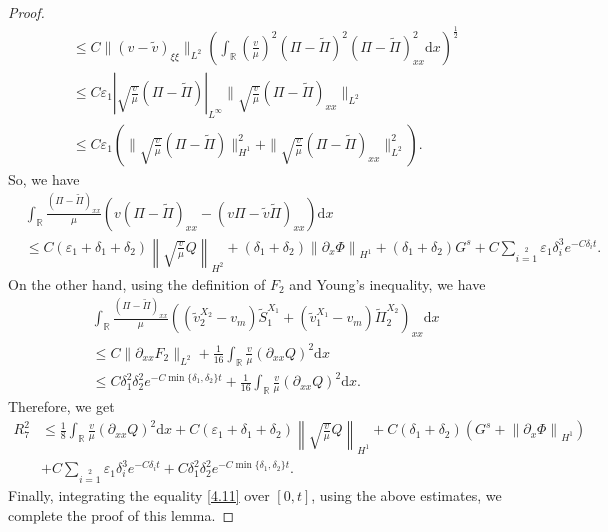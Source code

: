 \documentclass[10pt,a4paper]{amsart}
\newcommand{\dif}{\mathrm{d}}
\begin{document}
\begin{proof}
\begin{align*}
&\leq C
\|(v-\widetilde{v})_{\xi\xi}\|_{L^2}
\left(\int_\mathbb{R}\left(\frac{v}{\mu}\right)^2(\Pi-\widetilde{\Pi})^2(\Pi-\widetilde{\Pi})_{xx}^2\dif x\right)^{\frac{1}{2}}\\
&\leq C\varepsilon_1|\sqrt{\frac{v}{\mu}}(\Pi-\widetilde{\Pi})|_{L^{\infty}}
\|\sqrt{\frac{v}{\mu}}(\Pi-\widetilde{\Pi})_{xx}\|_{L^2}\\
&\leq C\varepsilon_1\left(\|\sqrt{\frac{v}{\mu}}(\Pi-\widetilde{\Pi})\|_{H^1}^2+
\|\sqrt{\frac{v}{\mu}}(\Pi-\widetilde{\Pi})_{xx}\|_{L^2}^2\right).
\end{align*}
So, we have
\begin{align*}
 &\int_\mathbb{R}\frac{(\Pi-\widetilde{\Pi})_{xx}}{\mu}
 \left(v(\Pi-\widetilde{\Pi})_{xx}-(v\Pi-\widetilde{v}\widetilde{\Pi})_{xx}\right)\dif x\\
 &\le C(\varepsilon_1+\delta_1+\delta_2)\left\|\sqrt{\frac{v}{\mu}}Q\right\|_{H^2}
 +(\delta_1+\delta_2)\left\|\partial_x\Phi\right\|_{H^1}+(\delta_1+\delta_2)G^s+C\sum\limits_{i=1}\limits^2\varepsilon_1 \delta_i^3e^{-C\delta_i t}.
\end{align*}
On the other hand, using the definition of $F_2$ and Young's inequality, we have
\begin{align*}
 &\int_\mathbb{R}\frac{(\Pi-\widetilde{\Pi})_{xx}}{\mu}
 \left(\left(\widetilde{v}^{X_2}_2-v_m\right)\widetilde{S}_1^{X_1}
+\left(\widetilde{v}^{X_1}_1-v_m\right)\widetilde{\Pi}_2^{X_2}\right)_{xx}\dif x\\
&\le C\|\partial_{xx}F_2\|_{L^2}
+\frac{1}{16}\int_\mathbb{R}\frac{v}{\mu}(\partial_{xx}Q)^2\dif x\\
&\le C\delta_1^2\delta_2^2e^{-C\min\{\delta_1,\delta_2\}t}
+\frac{1}{16}\int_\mathbb{R}\frac{v}{\mu}(\partial_{xx}Q)^2\dif x.
\end{align*}
Therefore, we get
\begin{align*}
R_7^2&\le \frac{1}{8}\int_\mathbb{R}\frac{v}{\mu}(\partial_{xx}Q)^2\dif x
 +C(\varepsilon_1+\delta_1+\delta_2)\left\|\sqrt{\frac{v}{\mu}}Q\right\|_{H^1}
  +C(\delta_1+\delta_2)\left(G^s+\left\|\partial_x\Phi\right\|_{H^1}\right)\\
  &+C\sum\limits_{i=1}\limits^2\varepsilon_1 \delta_i^3e^{-C\delta_i t}
 +C\delta_1^2\delta_2^2e^{-C\min\{\delta_1,\delta_2\}t}.
\end{align*}
Finally, integrating the equality \eqref{4.11} over $[0,t]$, using the above estimates, we complete the proof of this lemma.
\end{proof}
\end{document}
